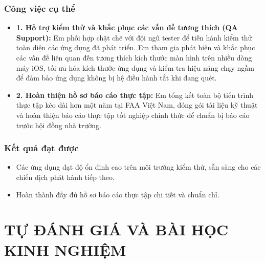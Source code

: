 \documentclass[12pt, a4paper]{article}
\begin{document}
\subsubsection{Công việc cụ thể}
\begin{itemize}
    \item \textbf{1. Hỗ trợ kiểm thử và khắc phục các vấn đề tương thích (QA Support):}
    Em phối hợp chặt chẽ với đội ngũ tester để tiến hành kiểm thử toàn diện các ứng dụng đã phát triển. Em tham gia phát hiện và khắc phục các vấn đề liên quan đến tương thích kích thước màn hình trên nhiều dòng máy iOS, tối ưu hóa kích thước ứng dụng và kiểm tra hiệu năng chạy ngầm để đảm bảo ứng dụng không bị hệ điều hành tắt khi đang quét.
    
    \item \textbf{2. Hoàn thiện hồ sơ báo cáo thực tập:}
    Em tổng kết toàn bộ tiến trình thực tập kéo dài hơn một năm tại FAA Việt Nam, đóng gói tài liệu kỹ thuật và hoàn thiện báo cáo thực tập tốt nghiệp chính thức để chuẩn bị báo cáo trước hội đồng nhà trường.
\end{itemize}
\subsubsection{Kết quả đạt được}
\begin{itemize}
    \item Các ứng dụng đạt độ ổn định cao trên môi trường kiểm thử, sẵn sàng cho các chiến dịch phát hành tiếp theo.
    \item Hoàn thành đầy đủ hồ sơ báo cáo thực tập chi tiết và chuẩn chỉ.
\end{itemize}

\section{TỰ ĐÁNH GIÁ VÀ BÀI HỌC KINH NGHIỆM}
\end{document}
